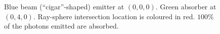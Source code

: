 \documentclass[12pt]{article}
\begin{document}
\begin{figure} 
\centering
{}
  \caption{
Blue beam (``cigar''-shaped) emitter at $(0, 0, 0)$. 
Green absorber at $(0, 4, 0)$. 
Ray-sphere intersection location is coloured in red.
$100\%$ of the photons emitted are absorbed.
}
\end{figure}
\end{document}
